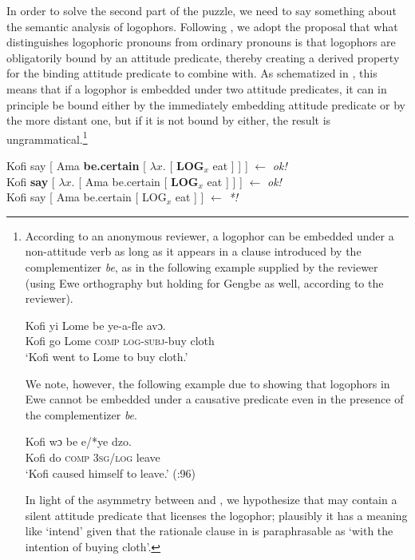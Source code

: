 \documentclass[output=paper,modfonts,nonflat]{langsci/langscibook}
\newcommand{\á}{\'{ã}}
\newcommand{\É}{\'{\~{ε}}}
\newcommand{\È}{\`{\~{ε}}}
\newcommand{\í}{\'{\~{i}}}
\newcommand{\ì}{\`{\~{i}}}
\renewcommand{\O}{ɔ}
\newcommand{\Ó}{\'{\~{ɔ}}}
\newcommand{\Ò}{\`{\~{ɔ}}}
\newcommand{\ú}{\'{ũ}}
\newcommand{\ù}{\`{ũ}}
\begin{document}
In order to solve the second part of the puzzle, we need to say something about the semantic analysis of logophors. Following \cite{Heim2002, Stechow2009, Stechow2003, Pearson2015}, we adopt the proposal that what distinguishes logophoric pronouns from ordinary pronouns is that logophors are obligatorily bound by an attitude predicate, thereby creating a derived property for the binding attitude predicate to combine with. As schematized in , this means that  if a logophor is embedded under two attitude predicates, it can in principle be bound either by the immediately embedding attitude predicate or by the more distant one, but if it is not bound by either, the result is ungrammatical.\footnote{According to an anonymous reviewer, a logophor can be embedded under a non-attitude verb as long as it appears in a clause introduced by the complementizer \emph{be}, as in the following example supplied by the reviewer (using Ewe orthography but holding for Gengbe as well, according to the reviewer).


\ea \label{ex:grano:reviewerLogophor:28}
\gll Kofi yi Lome be ye-a-ƒle av{\O}.\\
Kofi go Lome \textsc{comp} \textsc{log}-\textsc{subj}-buy cloth\\
\glt `Kofi went to Lome to buy cloth.'
\z

We note, however, the following example due to \cite{Pearson2015} showing that logophors in Ewe cannot be embedded under a causative predicate even in the presence of the complementizer \emph{be}. 

\ea \label{ex:grano:complementizerBe:29}
\gll Kofi w{\O} be e/*ye dzo.\\
Kofi do \textsc{comp} 3\textsc{sg}/\textsc{log} leave\\
\glt `Kofi caused himself to leave.' (\citealt{Pearson2015}:96)
\z

In light of the asymmetry between  and , we hypothesize that  may contain a silent attitude predicate that licenses the logophor; plausibly it has a meaning like `intend' given that the rationale clause in  is paraphrasable as `with the intention of buying cloth'.

}


\ea  \label{ex:grano:log:30}
    \begin{xlist}
    \ex Kofi say [ Ama \textbf{be.certain} [ $\lambda x$. [ \textbf{LOG}$_{x}$ eat ] ] ] \hfill $\leftarrow$ \emph{ok!}\\
    \ex Kofi \textbf{say} [ $\lambda x$. [ Ama be.certain  [ \textbf{LOG}$_{x}$ eat ] ] ] \hfill $\leftarrow$ \emph{ok!} \\
    \ex Kofi say  [ Ama be.certain  [ LOG$_{x}$ eat ] ] \hfill $\leftarrow$ \emph{*!}
    \end{xlist}
\z
\end{document}
